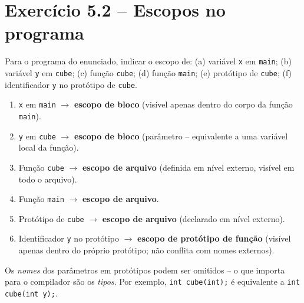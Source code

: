 \documentclass[12pt,a4paper]{article}
\begin{document}
\newpage

\section{Exercício 5.2 -- Escopos no programa}

\begin{enunciadoBox}[Enunciado 5.2]
Para o programa do enunciado, indicar o escopo de:
(a) variável \texttt{x} em \texttt{main};
(b) variável \texttt{y} em \texttt{cube};
(c) função \texttt{cube};
(d) função \texttt{main};
(e) protótipo de \texttt{cube};
(f) identificador \texttt{y} no protótipo de \texttt{cube}.
\end{enunciadoBox}

\begin{respostabox}
\begin{enumerate}[label=\textbf{\alph*)}]
\item \texttt{x} em \texttt{main} \quad $\to$ \quad \textbf{escopo de bloco}
(visível apenas dentro do corpo da função \texttt{main}).
\item \texttt{y} em \texttt{cube} \quad $\to$ \quad \textbf{escopo de bloco}
(parâmetro -- equivalente a uma variável local da função).
\item Função \texttt{cube} \quad $\to$ \quad \textbf{escopo de arquivo}
(definida em nível externo, visível em todo o arquivo).
\item Função \texttt{main} \quad $\to$ \quad \textbf{escopo de arquivo}.
\item Protótipo de \texttt{cube} \quad $\to$ \quad \textbf{escopo de arquivo}
(declarado em nível externo).
\item Identificador \texttt{y} no protótipo \quad $\to$ \quad \textbf{escopo de
protótipo de função} (visível apenas dentro do próprio protótipo; não conflita
com nomes externos).
\end{enumerate}

\begin{boaprática}
  Os \textit{nomes} dos parâmetros em protótipos podem ser omitidos -- o que
  importa para o compilador são os \textit{tipos}. Por exemplo,
  \texttt{int cube(int);} é equivalente a \texttt{int cube(int y);}.
\end{boaprática}
\end{respostabox}

\newpage

\end{document}
